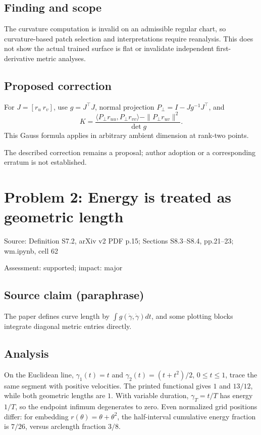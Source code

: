\documentclass[11pt]{article}
\begin{document}
\subsection*{Finding and scope}

The curvature computation is invalid on an admissible regular chart, so curvature-based patch selection and interpretations require reanalysis. This does not show the actual trained surface is flat or invalidate independent first-derivative metric analyses.

\subsection*{Proposed correction}

For \(J=[r_u\ r_v]\), use \(g=J^\top J\), normal projection \(P_\perp=I-Jg^{-1}J^\top\), and \[K=\frac{\langle P_\perp r_{uu},P_\perp r_{vv}\rangle-\|P_\perp r_{uv}\|^2}{\det g}.\] This Gauss formula applies in arbitrary ambient dimension at rank-two points.

The described correction remains a proposal; author adoption or a corresponding erratum is not established.

\section*{Problem 2: Energy is treated as geometric length}

Source: Definition S7.2, arXiv v2 PDF p.15; Sections S8.3–S8.4, pp.21–23; wm.ipynb, cell 62

Assessment: supported; impact: major

\subsection*{Source claim (paraphrase)}

The paper defines curve length by \(\int g(\dot\gamma,\dot\gamma)dt\), and some plotting blocks integrate diagonal metric entries directly.

\subsection*{Analysis}

On the Euclidean line, \(\gamma_1(t)=t\) and \(\gamma_2(t)=(t+t^2)/2\), \(0\leq t\leq1\), trace the same segment with positive velocities. The printed functional gives \(1\) and \(13/12\), while both geometric lengths are \(1\). With variable duration, \(\gamma_T=t/T\) has energy \(1/T\), so the endpoint infimum degenerates to zero. Even normalized grid positions differ: for embedding \(r(\theta)=\theta+\theta^2\), the half-interval cumulative energy fraction is \(7/26\), versus arclength fraction \(3/8\).
\end{document}
